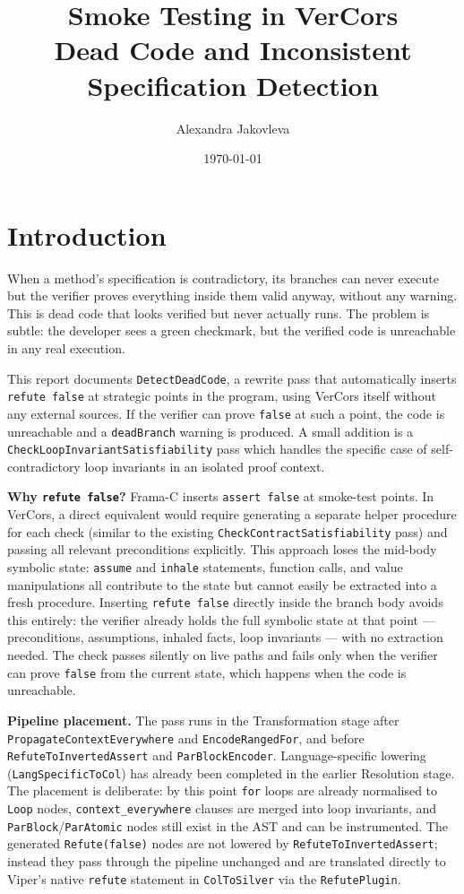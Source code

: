 \documentclass[9pt,a4paper,twocolumn]{article}
\title{\textbf{Smoke Testing in VerCors}\\
\large Dead Code and Inconsistent Specification Detection}
\author{Alexandra Jakovleva}
\date{\today}
\begin{document}
\maketitle

\section{Introduction}

When a method's specification is contradictory, its branches can
never execute but the verifier proves everything inside them
valid anyway, without any warning. This is dead code
that looks verified but never actually runs. The problem is subtle:
the developer sees a green checkmark, but the verified code is
unreachable in any real execution.

This report documents \texttt{DetectDeadCode}, a rewrite
pass that automatically inserts \texttt{refute false} at strategic
points in the program, using VerCors itself without any external sources. If the verifier can prove \texttt{false}
at such a point, the code is unreachable and a \texttt{deadBranch}
warning is produced. A small addition is a
\texttt{CheckLoopInvariantSatisfiability} pass which handles the specific case
of self-contradictory loop invariants in an isolated proof context.

\textbf{Why \texttt{refute false}?} Frama-C inserts
\texttt{assert false} at smoke-test points. In VerCors, a direct
equivalent would require generating a separate helper procedure for
each check (similar to the existing
\texttt{CheckContractSatisfiability} pass) and passing all relevant
preconditions explicitly. This approach loses the mid-body symbolic
state: \texttt{assume} and \texttt{inhale} statements, function
calls, and value manipulations all contribute to the state but
cannot easily be extracted into a fresh procedure. Inserting
\texttt{refute false} directly inside the branch body avoids this
entirely: the verifier already holds the full symbolic state at
that point — preconditions, assumptions, inhaled facts, loop
invariants — with no extraction needed. The check passes silently
on live paths and fails only when the verifier can prove
\texttt{false} from the current state, which happens when
the code is unreachable.

\textbf{Pipeline placement.} The pass runs in the Transformation
stage after \texttt{PropagateContextEverywhere} and
\texttt{EncodeRangedFor}, and before
\texttt{RefuteToInvertedAssert} and \texttt{ParBlockEncoder}.
Language-specific lowering (\texttt{LangSpecificToCol}) has already
been completed in the earlier Resolution stage. The placement is
deliberate: by this point \texttt{for} loops are
already normalised to \texttt{Loop} nodes,
\texttt{context\_everywhere} clauses are merged into loop invariants,
and \texttt{ParBlock}/\texttt{ParAtomic} nodes still exist in the
AST and can be instrumented. The generated \texttt{Refute(false)}
nodes are not lowered by \texttt{RefuteToInvertedAssert}; instead
they pass through the pipeline unchanged and are translated
directly to Viper's native \texttt{refute} statement in
\texttt{ColToSilver} via the \texttt{RefutePlugin}.
\end{document}
